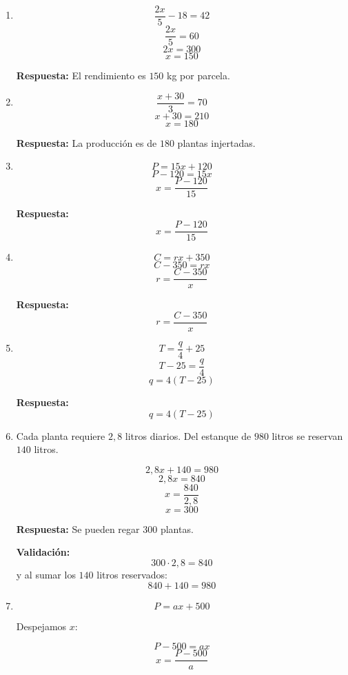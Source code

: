 \documentclass[11pt]{article}
\begin{document}
\begin{enumerate}[label=\textbf{\arabic*.}]
	\textbf{Respuesta:} Se distribuyen \(240\) litros de agua.
	
	\item 
	\[
	\frac{2x}{5}-18=42
	\]
	\[
	\frac{2x}{5}=60
	\]
	\[
	2x=300
	\]
	\[
	x=150
	\]
	
	\textbf{Respuesta:} El rendimiento es \(150\) kg por parcela.
	
	\item 
	\[
	\frac{x+30}{3}=70
	\]
	\[
	x+30=210
	\]
	\[
	x=180
	\]
	
	\textbf{Respuesta:} La producción es de \(180\) plantas injertadas.
	
	\item 
	\[
	P=15x+120
	\]
	\[
	P-120=15x
	\]
	\[
	x=\frac{P-120}{15}
	\]
	
	\textbf{Respuesta:}
	\[
	\boxed{x=\frac{P-120}{15}}
	\]
	
	\item 
	\[
	C=rx+350
	\]
	\[
	C-350=rx
	\]
	\[
	r=\frac{C-350}{x}
	\]
	
	\textbf{Respuesta:}
	\[
	\boxed{r=\frac{C-350}{x}}
	\]
	
	\newpage
	\vspace*{0.2cm}
	\item 
	\[
	T=\frac{q}{4}+25
	\]
	\[
	T-25=\frac{q}{4}
	\]
	\[
	q=4(T-25)
	\]
	
	\textbf{Respuesta:}
	\[
	\boxed{q=4(T-25)}
	\]
	
	\item 
	Cada planta requiere \(2,8\) litros diarios. Del estanque de \(980\) litros se reservan \(140\) litros.
	
	\[
	2,8x+140=980
	\]
	\[
	2,8x=840
	\]
	\[
	x=\frac{840}{2,8}
	\]
	\[
	x=300
	\]
	
	\textbf{Respuesta:} Se pueden regar \(300\) plantas.
	
	\textbf{Validación:}
	\[
	300\cdot 2,8=840
	\]
	y al sumar los \(140\) litros reservados:
	\[
	840+140=980
	\]
	
	\item 
	\[
	P=ax+500
	\]
	
	Despejamos \(x\):
	
	\[
	P-500=ax
	\]
	\[
	x=\frac{P-500}{a}
	\]
	

\end{enumerate}
\end{document}
